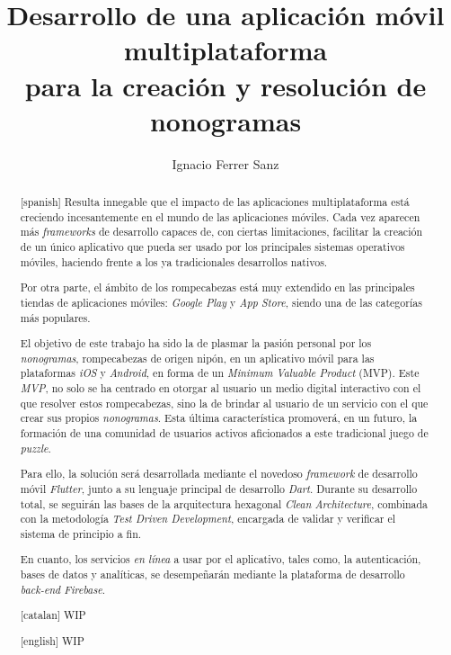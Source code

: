 \documentclass[11pt,spanish,listoffigures,listoftables]{tfgetsinf}
\title{Desarrollo de una aplicación móvil multiplataforma \\
para la creación y resolución de nonogramas}
\author{Ignacio Ferrer Sanz}
\begin{document}

\begin{abstract}[spanish]
    Resulta innegable que el impacto de las aplicaciones multiplataforma está creciendo incesantemente
    en el mundo de las aplicaciones móviles.
    Cada vez aparecen más \textit{frameworks} de desarrollo capaces de, con ciertas limitaciones,
    facilitar la creación de un único aplicativo que pueda ser usado por los principales sistemas operativos móviles, haciendo frente a
    los ya tradicionales desarrollos nativos.

    Por otra parte, el ámbito de los rompecabezas está muy extendido en las principales
    tiendas de aplicaciones móviles: \textit{Google Play} y \textit{App Store}, siendo una
    de las categorías más populares.

    El objetivo de este trabajo ha sido la de plasmar la pasión personal por los \textit{nonogramas}, rompecabezas de
    origen nipón, en un aplicativo móvil para las plataformas \textit{iOS} y \textit{Android}, en forma de un
    \textit{Minimum Valuable Product} (MVP).
    Este \textit{MVP}, no solo se ha centrado en otorgar al usuario un medio digital interactivo con
    el que resolver estos rompecabezas, sino la de brindar al usuario de un servicio con el que crear
    sus propios \textit{nonogramas}. Esta última característica promoverá, en un futuro, la formación de una comunidad de usuarios activos aficionados
    a este tradicional juego de \textit{puzzle}.

    Para ello, la solución será desarrollada mediante el novedoso \textit{framework} de desarrollo
    móvil \textit{Flutter}, junto a su lenguaje principal de desarrollo \textit{Dart}. Durante su
    desarrollo total, se seguirán las bases de la arquitectura hexagonal \textit{Clean Architecture},
    combinada con la metodología \textit{Test Driven Development}, encargada de validar y verificar el
    sistema de principio a fin.

    En cuanto, los servicios \textit{en línea} a usar por el aplicativo, tales como, la autenticación, bases de datos y analíticas, se desempeñarán mediante la plataforma de 
    desarrollo \textit{back-end} \textit{Firebase}.
\end{abstract}
\begin{abstract}[catalan]
WIP
\end{abstract}
\begin{abstract}[english]
WIP
\end{abstract}
\end{document}
